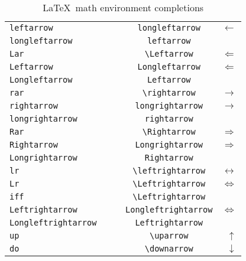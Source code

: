 \documentclass[a4paper,11pt]{scrartcl}
\begin{document}
\begin{table}[tb]
\begin{center}
\begin{tabular}{lcr}
    \verb|leftarrow|                           &    \verb|longleftarrow|                      &    $\longleftarrow$  \\
    \verb|longleftarrow|                       &    \verb|leftarrow|                          &    $\mbox{}$  \\
    \verb|Lar|                                 &    \verb|\Leftarrow|                         &    $\Leftarrow$  \\
    \verb|Leftarrow|                           &    \verb|Longleftarrow|                      &    $\Longleftarrow$  \\
    \verb|Longleftarrow|                       &    \verb|Leftarrow|                          &    $\mbox{}$  \\
    \verb|rar|                                 &    \verb|\rightarrow|                        &    $\rightarrow$  \\
    \verb|rightarrow|                          &    \verb|longrightarrow|                     &    $\longrightarrow$  \\
    \verb|longrightarrow|                      &    \verb|rightarrow|                         &    $\mbox{}$  \\
    \verb|Rar|                                 &    \verb|\Rightarrow|                        &    $\Rightarrow$  \\
    \verb|Rightarrow|                          &    \verb|Longrightarrow|                     &    $\Longrightarrow$  \\
    \verb|Longrightarrow|                      &    \verb|Rightarrow|                         &    $\mbox{}$  \\
    \verb|lr|                                  &    \verb|\leftrightarrow|                    &    $\leftrightarrow$  \\
    \verb|Lr|                                  &    \verb|\Leftrightarrow|                    &    $\Leftrightarrow$  \\
    \verb|iff|                                 &    \verb|\Leftrightarrow|                    &    \mbox{}  \\
    \verb|Leftrightarrow|                      &    \verb|Longleftrightarrow|                 &    $\Longleftrightarrow$  \\
    \verb|Longleftrightarrow    |              &    \verb|  Leftrightarrow  |                 &    $\mbox{}$  \\
    \verb|up|                                  &    \verb|\uparrow|                           &    $\uparrow$  \\
    \verb|do|                                  &    \verb|\downarrow|                         &    $\downarrow$  \\
    \hline
    \end{tabular}
  \end{center}
\caption{\LaTeX \ math environment completions \smiley}
\end{table}
\end{document}
